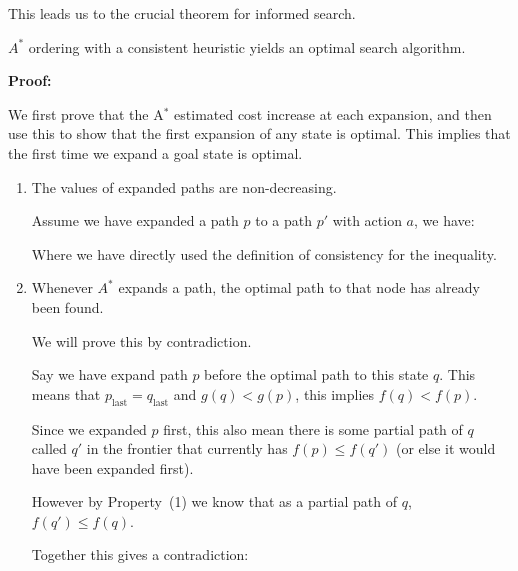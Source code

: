 \documentclass[11pt]{article}
\begin{document}
This leads us to the crucial theorem for informed search.

\begin{theorem}
  $A^*$ ordering  with a consistent heuristic yields an optimal search algorithm.
\end{theorem}

\noindent \textbf{Proof:}

We first prove that the A$^*$ estimated cost increase at each expansion, and then use this to show that the first expansion of any state is optimal. This implies that the first time we expand a goal state is optimal.  

\begin{enumerate}
\item The values of expanded paths are non-decreasing.

Assume we have expanded a path $p$ to a path $p'$ with action $a$, we have:


\noindent Where we have directly used the definition of consistency for the inequality.

\item Whenever $A^*$ expands a path, the optimal path to that node has already been found. 

We will prove this by contradiction. 

Say we have expand path $p$ before the optimal path to this state $q$. This means that $p_{\mathrm{last}} =q_\mathrm{last}$ and  $g(q) < g(p)$, this implies $f(q) < f(p)$.

Since we expanded $p$ first, this also mean there is some partial path
of $q$ called $q'$ in the frontier that currently has $f(p) \leq f(q')$ (or else it
would have been expanded first).

However by Property~(1) we know that as a partial path of $q$, $f(q') \leq f(q)$. 

Together this gives a contradiction:




\end{enumerate}
\QED
\end{document}
